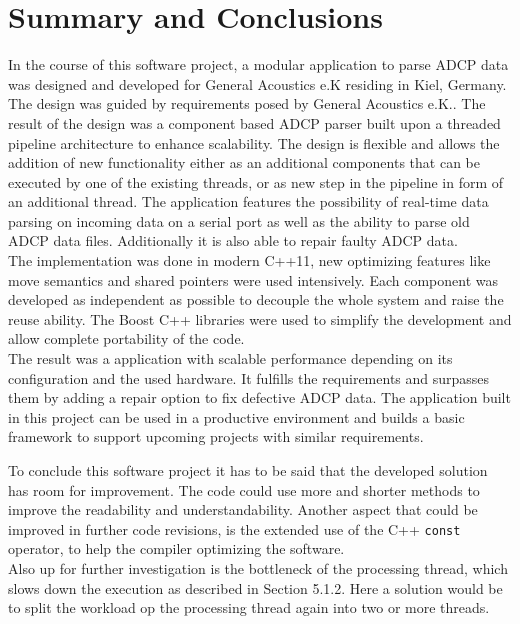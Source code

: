 \chapter{Summary and Conclusions}
In the course of this software project, a modular application to parse ADCP data was designed and developed for General Acoustics e.K residing in Kiel, Germany. The design was guided by requirements posed by General Acoustics e.K.. The result of the design was a component based ADCP parser built upon a threaded pipeline architecture to enhance scalability. The design is flexible and allows the addition of new functionality either as an additional components that can be executed by one of the existing threads, or as new step in the pipeline in form of an additional thread. The application features the possibility of real-time data parsing on incoming data on a serial port as well as the ability to parse old ADCP data files. Additionally it is also able to repair faulty ADCP data.\\
The implementation was done in modern C++11, new optimizing features like move semantics and shared pointers were used intensively. Each component was developed as independent as possible to decouple the whole system and raise the reuse ability. The Boost C++ libraries were used to simplify the development and allow complete portability of the code.\\
The result was a application with scalable performance depending on its configuration and the used hardware. It fulfills the requirements and surpasses them by adding a repair option to fix defective ADCP data. The application built in this project can be used in a productive environment and builds a basic framework to support upcoming projects with similar requirements.

To conclude this software project it has to be said that the developed solution has room for improvement. The code could use more and shorter methods to improve the readability and understandability. Another aspect that could be 
improved in further code revisions, is the extended use of the C++ \texttt{const} operator, to help the compiler optimizing the software.\\
Also up for further investigation is the bottleneck of the processing thread, which slows down the execution as described in Section 5.1.2. Here a solution would be to split the workload op the processing thread again into two or more threads.
